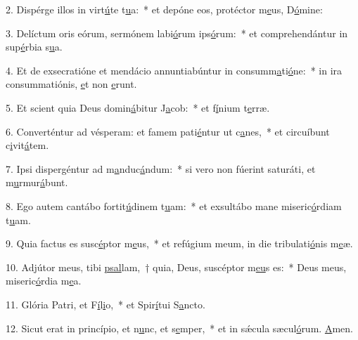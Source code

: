 2. Dispérge illos in virt\uline{ú}te t\uline{u}a:~* et depóne eos, protéctor m\uline{e}us, D\uline{ó}mine:\par 
3. Delíctum oris eórum, sermónem labi\uline{ó}rum ips\uline{ó}rum:~* et comprehendántur in sup\uline{é}rbia s\uline{u}a.\par 
4. Et de exsecratióne et mendácio annuntiabúntur in consumm\uline{a}ti\uline{ó}ne:~* in ira consummatiónis, \uline{e}t non \uline{e}runt.\par 
5. Et scient quia Deus domin\uline{á}bitur J\uline{a}cob:~* et f\uline{í}nium t\uline{e}rræ.\par 
6. Converténtur ad vésperam: et famem pati\uline{é}ntur ut c\uline{a}nes,~* et circuíbunt c\uline{i}vit\uline{á}tem.\par 
7. Ipsi dispergéntur ad m\uline{a}nduc\uline{á}ndum:~* si vero non fúerint saturáti, et m\uline{u}rmur\uline{á}bunt.\par 
8. Ego autem cantábo fortit\uline{ú}dinem t\uline{u}am:~* et exsultábo mane miseric\uline{ó}rdiam t\uline{u}am.\par 
9. Quia factus es susc\uline{é}ptor m\uline{e}us,~* et refúgium meum, in die tribulati\uline{ó}nis m\uline{e}æ.\par 
10. Adjútor meus, tibi \uline{psal}lam,~† quia, Deus, suscéptor m\uline{e}\uline{u}s es:~* Deus meus, miseric\uline{ó}rdia m\uline{e}a.\par 
11. Glória Patri, et F\uline{í}l\uline{i}o,~* et Spir\uline{í}tui S\uline{a}ncto.\par 
12. Sicut erat in princípio, et n\uline{u}nc, et s\uline{e}mper,~* et in sǽcula sæcul\uline{ó}rum. \uline{A}men.\par 
